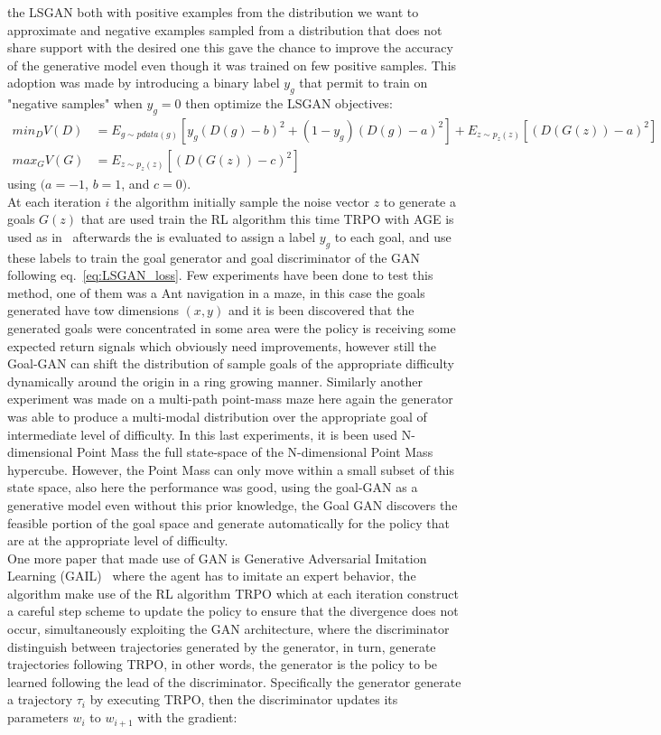 the LSGAN both with positive examples from the distribution we want to approximate and negative examples
sampled from a distribution that does not share support with the desired one this gave the chance to improve the accuracy of the generative model even though it was trained on few positive samples. This adoption was made by introducing a binary label $y_g$ that permit to train on "negative samples" when $y_g = 0$ then optimize the LSGAN objectives:
\begin{align}
\nonumber min_D V(D) &= E_{g \sim pdata(g)}[y_g(D(g)-b)^2 + (1 -y_g)(D(g)- a)^2] + E_{z∼p_z(z)}[(D(G(z))- a)^2]\\ 
max_G V(G) &= E_{z∼p_z(z)}[(D(G(z))- c)^2]
\label{eq:LSGAN_loss}
\end{align}
using $(a = -1$, $b = 1$, and $c = 0)$. \\At each iteration $i$ the algorithm initially sample the noise vector $z$ to generate a goals $G(z)$  that are used train the RL algorithm this time TRPO with AGE is used as in~\cite{schulman2015high} afterwards the is evaluated to assign a label $y_g$ to each goal, and use these labels to train the goal generator and goal discriminator of the GAN following eq.~\ref{eq:LSGAN_loss}. Few experiments have been done to test this method, one of them was a Ant navigation in a maze, in this case the goals generated have tow dimensions $(x,y)$ and it is been discovered that the generated goals were concentrated in some area were the policy is receiving some expected return signals which obviously need improvements, however still the Goal-GAN can shift the distribution of sample goals of the appropriate difficulty dynamically around the origin in a ring growing manner. Similarly another experiment was made on a multi-path point-mass maze here again the generator was able to produce a multi-modal distribution over the appropriate goal of intermediate level of difficulty. In this last experiments, it is been used N-dimensional Point Mass the full state-space of the N-dimensional Point Mass hypercube. However, the Point Mass can only move within a small subset of this state space, also here the performance was good, using the goal-GAN as a generative model even
without this prior knowledge, the Goal GAN discovers the feasible portion of the goal space and generate automatically for the policy that are at the appropriate level of difficulty.\\
One more paper that made use of GAN is Generative Adversarial Imitation Learning (GAIL)~\cite{DBLP:journals/corr/HoE16} where the agent has to imitate an expert behavior, the algorithm make use of the RL algorithm TRPO which at each iteration construct a careful step scheme to update the policy to ensure that the divergence does not occur, simultaneously exploiting the GAN architecture, where the discriminator distinguish between trajectories generated by the generator, in turn, generate trajectories following TRPO, in other words, the generator is the policy to be learned following the lead of the discriminator. Specifically the generator generate a trajectory $\tau_i$ by executing TRPO, then the discriminator updates its parameters $w_i$ to $w_{i+1}$ with the gradient:
